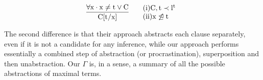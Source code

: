 \noindent
\[
\begin{array}{llll}
\vcenter{
\infer[]
{\m{C[t/x]}}
{
	\m{\forall x \cdot x \neq t \lor C}
}} &
\begin{array}{ll}
	\m{\sci{1} C,t \prec l^t}\\
	\m{\sci{2} x \not\trianglelefteq t}\\
\end{array}\\
\end{array}
\]

\bigskip

The second difference is that their approach abstracts each clause separately, even if it is not a candidate for any inference, while our approach performs essentially a combined step of abstraction (or procrastination), superposition and then unabstraction.
Our $\Gamma$ is, in a sense, a summary of all the possible abstractions of maximal terms.
%
%
%
